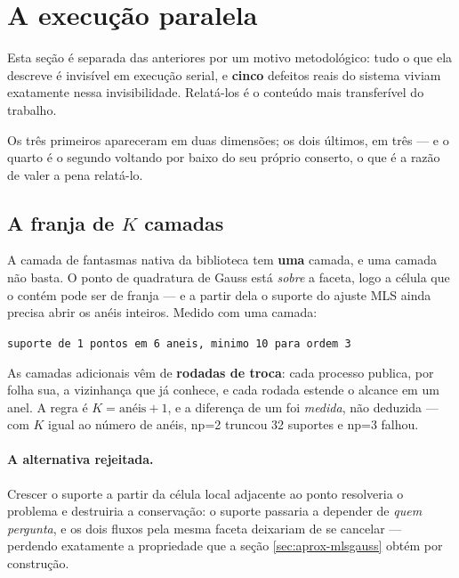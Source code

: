 \section{A execução paralela}
\label{sec:paralelo}


Esta seção é separada das anteriores por um motivo metodológico: tudo o que ela
descreve é invisível em execução serial, e \textbf{cinco} defeitos reais do
sistema viviam exatamente nessa invisibilidade. Relatá-los é o conteúdo mais
transferível do trabalho.

Os três primeiros apareceram em duas dimensões; os dois últimos, em três --- e o
quarto é o segundo voltando por baixo do seu próprio conserto, o que é a razão
de valer a pena relatá-lo.

\subsection{A franja de $K$ camadas}

A camada de fantasmas nativa da biblioteca tem \textbf{uma} camada, e uma camada
não basta. O ponto de quadratura de Gauss está \emph{sobre} a faceta, logo a
célula que o contém pode ser de franja --- e a partir dela o suporte do ajuste MLS
ainda precisa abrir os anéis inteiros. Medido com uma camada:

\begin{center}
\texttt{suporte de 1 pontos em 6 aneis, minimo 10 para ordem 3}
\end{center}

As camadas adicionais vêm de \textbf{rodadas de troca}: cada processo publica, por
folha sua, a vizinhança que já conhece, e cada rodada estende o alcance em um
anel. A regra é $K = \text{anéis} + 1$, e a diferença de um foi \emph{medida}, não
deduzida --- com $K$ igual ao número de anéis, np=2 truncou 32 suportes e np=3
falhou.

\paragraph{A alternativa rejeitada.} Crescer o suporte a partir da célula local
adjacente ao ponto resolveria o problema e destruiria a conservação: o suporte
passaria a depender de \emph{quem pergunta}, e os dois fluxos pela mesma faceta
deixariam de se cancelar --- perdendo exatamente a propriedade que a seção
\ref{sec:aprox-mlsgauss} obtém por construção.

